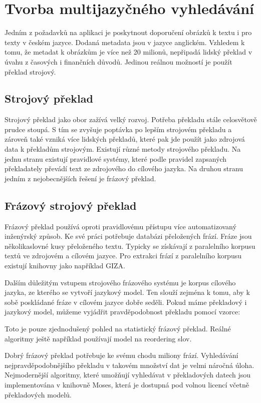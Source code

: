 \chapter{Tvorba multijazyčného vyhledávání}

Jedním z požadavků na aplikaci je poskytnout doporučení obrázků k textu i pro texty v českém jazyce. Dodaná metadata jsou v jazyce anglickém. Vzhledem k tomu, že metadat k obrázkům je více než 20 milionů, nepřipadá lidský překlad v úvahu z časových i finančních důvodů. Jedinou reálnou možností je použít překlad strojový.

\section{Strojový překlad}

Strojový překlad jako obor zažívá velký rozvoj. Potřeba překladu stále celosvětově prudce stoupá. S tím se zvyšuje poptávka po lepším strojovém překladu a zároveň také vzniká více lidských překladů, které pak jde použít jako zdrojová data k překladům strojovým. Existují různé metody strojového překladu. Na jednu stranu existují pravidlové systémy, které podle pravidel zapsaných překladately převádí text ze zdrojového do cílového jazyka. Na druhou stranu jedním z nejobecnějších řešení je frázový překlad.

\section{Frázový strojový překlad}

Frázový překlad používá oproti pravidlovému přístupu více automatizovaný inženýrský způsob. Ke své práci potřebuje databázi přeložených frází. Fráze jsou několikaslovné kusy přeloženého textu. Typicky se získávají z paralelního korpusu textů ve zdrojovém a cílovém jazyce. Pro extrakci frází z paralelního korpusu existují knihovny jako například GIZA.

Dalším důležitým vstupem strojového frázového systému je korpus cílového jazyka, ze kterého se vytvoří jazykový model. Ten slouží zejména k tomu, aby k sobě poskládané fráze v cílovém jazyce dobře seděli. Pokud máme překladový i jazykový model, můžeme vyjádřit pravděpodobnost překladu pomocí vzorce:

Toto je pouze zjednodušený pohled na statistický frázový překlad. Reálné algoritmy ještě například používají model na reordering slov.

Dobrý frázový překlad potřebuje ke svému chodu miliony frází. Vyhledávání nejpravděpodobnějšího překladu v takovém množství dat je velmi náročná úloha. Nejmodernější algoritmy, které umožňují vyhledávat v překladových datech jsou implementována v knihovně Moses, která je dostupná pod volnou licencí včetně překladových modelů.

